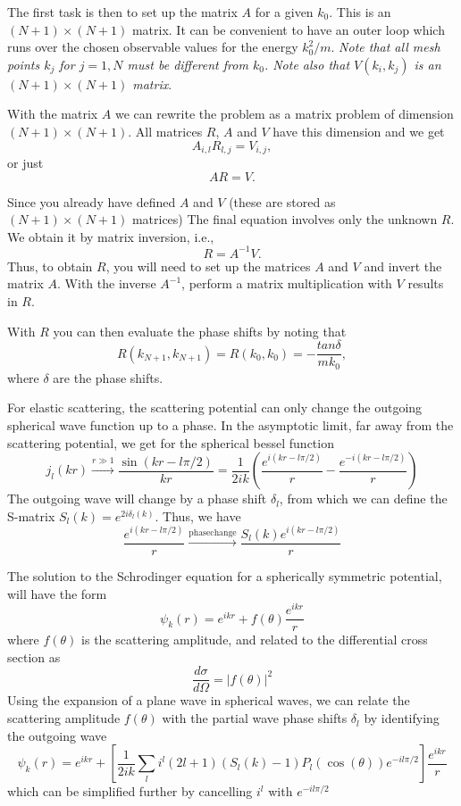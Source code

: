\documentclass[graybox,sectrefs,envcountresetchap,open=right]{svmonodo}
\begin{document}
The first task is then to 
set up the matrix $A$ for a given $k_0$. This is an
$(N+1)\times (N+1)$ matrix. It can be convenient
to have an outer loop which runs over the chosen
observable values for the energy $k_0^2/m$.
{\em Note that all mesh points $k_j$ for $j=1,N$ must be
different from $k_0$. Note also that
$V(k_i,k_j)$ is an
$(N+1)\times (N+1)$ matrix}. 

With the matrix $A$ we can rewrite the problem as a matrix problem of dimension $(N+1)\times (N+1)$.
All matrices $R$, $A$ and $V$ have this dimension and we get
\[
    A_{i,l}R_{l,j}=V_{i,j},
\] 
or just
\[
    AR=V.
\] 



Since you already have defined $A$ and $V$
(these are stored as $(N+1)\times (N+1)$ matrices) 
The final equation involves only the unknown
$R$. We obtain it by matrix inversion, i.e.,
\begin{equation}
    R=A^{-1}V.
    \label{eq:final2}
\end{equation}
Thus, to obtain $R$, you will need to set up the matrices
$A$ and $V$ and invert the matrix $A$. 
With the inverse $A^{-1}$, perform
a matrix multiplication with $V$ results in $R$.



With $R$ you can then evaluate the phase shifts
by noting that 
\[
      R(k_{N+1},k_{N+1})=R(k_0,k_0)=-\frac{tan\delta}{mk_0},
\]
where $\delta$ are the phase shifts.



For elastic scattering, the scattering potential can only change the outgoing spherical wave function up to a phase. In the asymptotic limit, far away from the scattering potential, we get for the spherical bessel function
\[
j_l(kr) \xrightarrow[]{ r \gg 1} \frac{\sin(kr -l\pi/2)}{kr} =  \frac{1}{2ik}\left( \frac{e^{i(kr-l\pi/2)}}{r} - \frac{e^{-i(kr-l\pi/2)}}{r}\right)
\]
The outgoing wave will change by a phase shift $\delta_l$, from which we can define the S-matrix $S_l(k) = e^{2i\delta_l(k)}$. Thus, we have
\[
 \frac{e^{i(kr-l\pi/2)}}{r} \xrightarrow[]{\mathrm{phase change}}  \frac{S_l(k)e^{i(kr-l\pi/2)}}{r}
\]



The solution to the Schrodinger equation for a spherically symmetric potential, will have the form
\[
\psi_k(r) = e^{ikr} + f(\theta)\frac{e^{ikr}}{r}
\]
where $f(\theta)$ is the scattering amplitude, and related to the differential cross section as
\[
\frac{d\sigma}{d\Omega} = |f(\theta)|^2
\]
Using the expansion of a plane wave in spherical waves, we can relate the scattering amplitude $f(\theta)$ with the partial wave phase shifts $\delta_l$ by identifying the outgoing wave 
\[
\psi_k(r) = e^{ikr} + \left[\frac{1}{2ik}\sum_l i^l (2l+1) (S_l(k)-1)P_l(\cos(\theta))e^{-il\pi/2}\right] \frac{e^{ikr}}{r}
\]
which can be simplified further by cancelling $i^l$ with $e^{-il\pi/2}$ 
\end{document}
